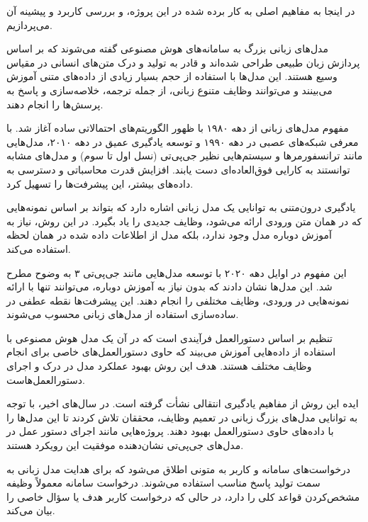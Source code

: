 در اینجا به مفاهیم اصلی به کار برده شده در این پروژه، و بررسی کاربرد و پیشینه آن می‌پردازیم.

مدل‌های زبانی بزرگ به سامانه‌های هوش مصنوعی گفته می‌شوند که بر اساس پردازش زبان طبیعی طراحی شده‌اند و قادر به تولید و درک متن‌های انسانی در مقیاس وسیع هستند. این مدل‌ها با استفاده از حجم بسیار زیادی از داده‌های متنی آموزش می‌بینند و می‌توانند وظایف متنوع زبانی، از جمله ترجمه، خلاصه‌سازی و پاسخ به پرسش‌ها را انجام دهند. 

مفهوم مدل‌های زبانی از دهه ۱۹۸۰ با ظهور الگوریتم‌های احتمالاتی ساده آغاز شد. با معرفی شبکه‌های عصبی در دهه ۱۹۹۰ و توسعه یادگیری عمیق در دهه ۲۰۱۰، مدل‌هایی مانند ترانسفورمرها و سیستم‌هایی نظیر جی‌پی‌تی (نسل اول تا سوم) و مدل‌های مشابه توانستند به کارایی فوق‌العاده‌ای دست یابند.
افزایش قدرت محاسباتی و دسترسی به داده‌های بیشتر، این پیشرفت‌ها را تسهیل کرد.

یادگیری درون‌متنی به توانایی یک مدل زبانی اشاره دارد که بتواند بر اساس نمونه‌هایی که در همان متن ورودی ارائه می‌شود، وظایف جدیدی را یاد بگیرد. در این روش، نیاز به آموزش دوباره مدل وجود ندارد، بلکه مدل از اطلاعات داده شده در همان لحظه استفاده می‌کند.

این مفهوم در اوایل دهه ۲۰۲۰ با توسعه مدل‌هایی مانند جی‌پی‌تی ۳ به وضوح مطرح شد. این مدل‌ها نشان دادند که بدون نیاز به آموزش دوباره، می‌توانند تنها با ارائه نمونه‌هایی در ورودی، وظایف مختلفی را انجام دهند. این پیشرفت‌ها نقطه عطفی در ساده‌سازی استفاده از مدل‌های زبانی محسوب می‌شوند.

تنظیم بر اساس دستورالعمل فرآیندی است که در آن یک مدل هوش مصنوعی با استفاده از داده‌هایی آموزش می‌بیند که حاوی دستورالعمل‌های خاصی برای انجام وظایف مختلف هستند.
هدف این روش بهبود عملکرد مدل در درک و اجرای دستورالعمل‌هاست.

ایده این روش از مفاهیم یادگیری انتقالی نشأت گرفته است. در سال‌های اخیر، با توجه به توانایی مدل‌های بزرگ زبانی در تعمیم وظایف، محققان تلاش کردند تا این مدل‌ها را با داده‌های حاوی دستورالعمل بهبود دهند. پروژه‌هایی مانند اجرای دستور عمل در مدل‌های جی‌پی‌تی نشان‌دهنده موفقیت این رویکرد هستند.

درخواست‌های سامانه و کاربر به متونی اطلاق می‌شود که برای هدایت مدل زبانی به سمت تولید پاسخ مناسب استفاده می‌شوند. درخواست سامانه معمولاً وظیفه مشخص‌کردن قواعد کلی را دارد، در حالی که درخواست کاربر هدف یا سؤال خاصی را بیان می‌کند.

